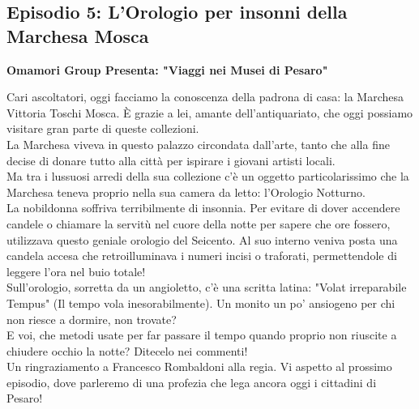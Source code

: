 \documentclass[hidelinks,12pt,a4paper]{article}
\begin{document}
\begin{flushleft}
		\subsection{Episodio 5: L'Orologio per insonni della Marchesa Mosca}
		\begin{center}
			\textbf{Omamori Group Presenta: "Viaggi nei Musei di Pesaro"}
		\end{center}
		Cari ascoltatori, oggi facciamo la conoscenza della padrona di casa: la Marchesa Vittoria Toschi Mosca. È grazie a lei, amante dell'antiquariato, che oggi possiamo visitare gran parte di queste collezioni.\\
		La Marchesa viveva in questo palazzo circondata dall'arte, tanto che alla fine decise di donare tutto alla città per ispirare i giovani artisti locali.\\
		Ma tra i lussuosi arredi della sua collezione c'è un oggetto particolarissimo che la Marchesa teneva proprio nella sua camera da letto: l'Orologio Notturno.\\
		La nobildonna soffriva terribilmente di insonnia. Per evitare di dover accendere candele o chiamare la servitù nel cuore della notte per sapere che ore fossero, utilizzava questo geniale orologio del Seicento. Al suo interno veniva posta una candela accesa che retroilluminava i numeri incisi o traforati, permettendole di leggere l'ora nel buio totale!\\
		Sull'orologio, sorretta da un angioletto, c'è una scritta latina: "Volat irreparabile Tempus" (Il tempo vola inesorabilmente). Un monito un po' ansiogeno per chi non riesce a dormire, non trovate?\\
		E voi, che metodi usate per far passare il tempo quando proprio non riuscite a chiudere occhio la notte? Ditecelo nei commenti!\\
		Un ringraziamento a Francesco Rombaldoni alla regia. Vi aspetto al prossimo episodio, dove parleremo di una profezia che lega ancora oggi i cittadini di Pesaro!\\
		

\end{flushleft}
\end{document}
